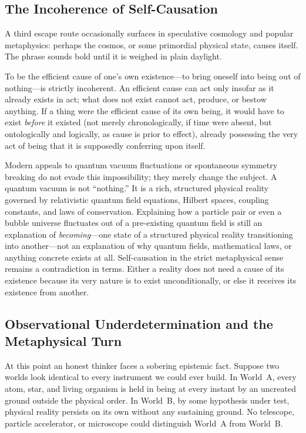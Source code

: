 \subsection{The Incoherence of Self-Causation}

A third escape route occasionally surfaces in speculative cosmology and popular metaphysics: perhaps the cosmos, or some primordial physical state, causes itself. The phrase sounds bold until it is weighed in plain daylight.

To be the efficient cause of one's own existence---to bring oneself into being out of nothing---is strictly incoherent. An efficient cause can act only insofar as it already exists in act; what does not exist cannot act, produce, or bestow anything. If a thing were the efficient cause of its own being, it would have to exist \emph{before} it existed (not merely chronologically, if time were absent, but ontologically and logically, as cause is prior to effect), already possessing the very act of being that it is supposedly conferring upon itself.

Modern appeals to quantum vacuum fluctuations or spontaneous symmetry breaking do not evade this impossibility; they merely change the subject. A quantum vacuum is not ``nothing.'' It is a rich, structured physical reality governed by relativistic quantum field equations, Hilbert spaces, coupling constants, and laws of conservation. Explaining how a particle pair or even a bubble universe fluctuates out of a pre-existing quantum field is still an explanation of \emph{becoming}---one state of a structured physical reality transitioning into another---not an explanation of why quantum fields, mathematical laws, or anything concrete exists at all. Self-causation in the strict metaphysical sense remains a contradiction in terms. Either a reality does not need a cause of its existence because its very nature is to exist unconditionally, or else it receives its existence from another.

\subsection{Observational Underdetermination and the Metaphysical Turn}

At this point an honest thinker faces a sobering epistemic fact. Suppose two worlds look identical to every instrument we could ever build. In World~A, every atom, star, and living organism is held in being at every instant by an uncreated ground outside the physical order. In World~B, by some hypothesis under test, physical reality persists on its own without any sustaining ground. No telescope, particle accelerator, or microscope could distinguish World~A from World~B.

